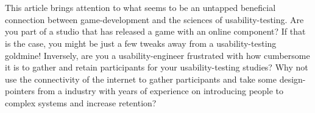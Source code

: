 \documentclass{article}
\begin{document}
  \thispagestyle{empty}

  \\
  \hspace*{0.0cm}
  \\

  {\large
    This article brings attention to what seems to be an untapped beneficial
    connection between game-development and the sciences of usability-testing.
    Are you part of a studio that has released a game with an online component?
    If that is the case, you might be just a few tweaks away from a
    usability-testing goldmine! Inversely, are you a usability-engineer
    frustrated with how cumbersome it is to gather and retain participants for
    your usability-testing studies? Why not use the connectivity of the
    internet to gather participants and take some design-pointers from a
    industry with years of experience on introducing people to complex systems
    and increase retention?
  }
\end{document}
